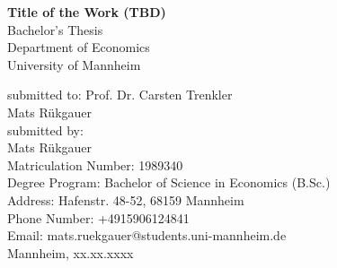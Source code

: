 
\begin{titlepage}

\begin{center}

\vspace*{1.2cm}

\huge {\bfseries Title of the Work (TBD)}\\[1.8cm]

\Large {Bachelor's Thesis}\\[1cm]

\large {Department of Economics}\\[0.2cm]

\large {University of Mannheim}\\[0.5cm]

\end{center}

\vfill

\noindent submitted to: Prof. Dr. Carsten Trenkler\\
Mats Rükgauer\\[1cm]
submitted by:\\
Mats Rükgauer\\[1cm]
Matriculation Number: 1989340\\
Degree Program: Bachelor of Science in Economics (B.Sc.)\\[1cm]
Address: Hafenstr. 48-52, 68159 Mannheim\\
Phone Number: +4915906124841\\
Email: mats.ruekgauer@students.uni-mannheim.de\\[1cm]
Mannheim, xx.xx.xxxx

\setcounter{page}{0}

\end{titlepage}
